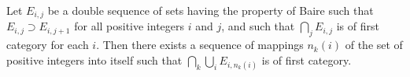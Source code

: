 Let $E_{i,j}$ be a double sequence of sets having the property of Baire such that $E_{i,j} \supset E_{i,j+1}$ for all positive integers $i$ and $j$, and such that $\bigcap_j E_{i,j}$ is of first category for each $i$. Then there exists a sequence of mappings $n_k(i)$ of the set of positive integers into itself such that $\bigcap_k \bigcup_i E_{i,n_k(i)}$ is of first category.
